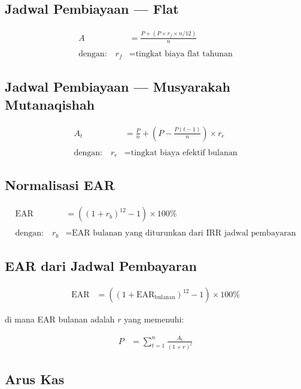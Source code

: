 \documentclass[12pt,a4paper,twoside]{report}
\begin{document}
\subsection{Jadwal Pembiayaan --- Flat}

\begin{align*}
  A &= \frac{P + (P \times r_f \times n/12)}{n} \\
 \\
 \text{dengan:}\quad r_f &= \text{tingkat biaya flat tahunan}
\end{align*}

\subsection{Jadwal Pembiayaan --- Musyarakah Mutanaqishah}

\begin{align*}
  A_t &= \frac{P}{n} + \left(P - \frac{P(t-1)}{n}\right) \times r_e \\
 \\
 \text{dengan:}\quad r_e &= \text{tingkat biaya efektif bulanan}
\end{align*}

\subsection{Normalisasi EAR}

\begin{align*}
  \text{EAR} &= \left((1 + r_b)^{12} - 1\right) \times 100\% \\
 \\
 \text{dengan:}\quad r_b &= \text{EAR bulanan yang diturunkan dari IRR jadwal pembayaran}
\end{align*}

\subsection{EAR dari Jadwal Pembayaran}

\begin{align*}
  \text{EAR} &= \left((1 + \text{EAR}_{\text{bulanan}})^{12} - 1\right) \times 100\%
\end{align*}

di mana EAR bulanan adalah $r$ yang memenuhi:

\begin{align*}
  P &= \sum_{t=1}^{n} \frac{A_t}{(1+r)^t}
\end{align*}

\subsection{Arus Kas}
\end{document}
